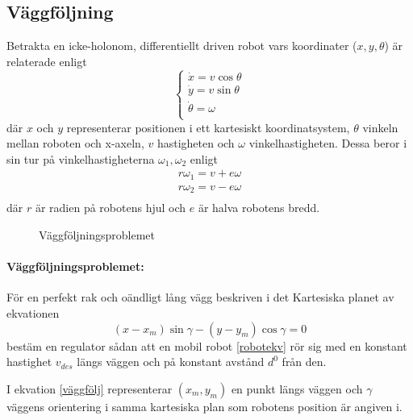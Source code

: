 \documentclass[11pt]{article}
\begin{document}
\begin{flushleft}
\subsection{Väggföljning}\label{väggföljning}
Betrakta en icke-holonom, differentiellt driven robot vars koordinater (\(x, y, \theta\)) är relaterade enligt
\begin{equation}\label{robotekv}
	\begin{cases}
  	\dot{x} = v\cos \theta \\
  	\dot{y} = v\sin \theta \\
   	 \dot{\theta} = \omega \\
  	\end{cases}
\end{equation}
där \(x\) och \(y\) representerar positionen i ett kartesiskt koordinatsystem, \(\theta\) vinkeln mellan roboten och x-axeln, \(v\) hastigheten och \(\omega\) vinkelhastigheten. Dessa beror i sin tur på vinkelhastigheterna \(\omega_1, \omega_2\) enligt
\begin{equation}\label{hjulekv}
	\begin{aligned}
	r\omega_1 = v + e\omega \\
	r\omega_2 = v - e\omega \\
	\end{aligned}
\end{equation}
där \(r\) är radien på robotens hjul och \(e\) är halva robotens bredd.

\begin{figure}[H] %
\centering
\noindent{}
	\caption{Väggföljningsproblemet\label{robot}}	
\end{figure}

\paragraph{Väggföljningsproblemet:} 
\begin{it}
För en perfekt rak och oändligt lång vägg beskriven i det Kartesiska planet av ekvationen
\begin{equation}\label{väggfölj}
	(x - x_m) \sin\gamma - (y - y_m) \cos \gamma = 0
\end{equation}
bestäm en regulator sådan att en mobil robot \eqref{robotekv} rör sig med en konstant hastighet \(v_{des}\) längs väggen och på konstant avstånd \(d^0\) från den.
\end{it}

I ekvation \eqref{väggfölj} representerar $(x_m, y_m)$ en punkt längs väggen och $\gamma$ väggens orientering i samma kartesiska plan som robotens position är angiven i.


\end{flushleft}
\end{document}
